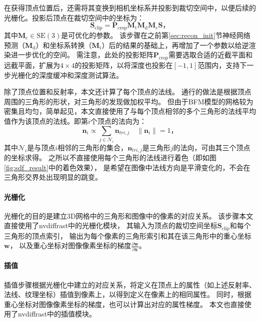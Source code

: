在获得顶点位置后，还需将其变换到相机坐标系并投影到裁切空间中，以便后续的光栅化。投影后顶点在裁切空间中的坐标为：
\begin{equation}
\mathbf{S}_\mathrm{clip} = \mathbf{P}_\mathrm{crop}\mathbf{M}_\mathrm{t}\mathbf{M}_\mathrm{d}\mathbf{M}_\mathrm{c}\mathbf{S}
\text{，}
\end{equation}
其中$\mathbf{M}_\mathrm{c}\in \mathrm{SE(3)}$是可优化的参数。
该步骤在之前第\ref{sec:recon_init}节神经网络预测（$\mathbf{M}_\mathrm{d}$）和坐标系转换（$\mathbf{M}_\mathrm{t}$）后的结果的基础上，再增加了一个参数以给逆渲染进一步优化的空间。
需注意，此处的投影矩阵$\mathbf{P}_\mathrm{crop}$需要选取合适的近截平面和远截平面，扩展为$4\times 4$的投影矩阵，以将深度也投影在$[-1,1]$范围内，支持下一步光栅化的深度缓冲和深度测试算法。

除了顶点位置和反射率，本文还计算了每个顶点的法线。
通行的做法是根据顶点周围的三角形的形状，对三角形的发现做加权平均。
但由于BFM模型的网格较为密集且均匀，简单起见，本文直接使用了与每个顶点相邻的多个三角形的法线平均值作为该顶点的法线。即第$i$个顶点的法向为：
\begin{equation}
\mathbf{n}_i \propto \sum_{j\in\mathcal{N}_i}\mathbf{n}_{tri,j} \quad
\|\mathbf{n}_i\| = 1
\text{，}
\end{equation}
其中$\mathcal{N}_i$是与顶点$i$相邻的三角形的集合，$\mathbf{n}_{tri,j}$是三角形$j$的法向，可由其三个顶点的坐标求得。
之所以不直接使用每个三角形的法线进行着色（即如图\ref{fig:sdf_result}中的着色效果），
是希望在图像中法线方向是平滑变化的，不会在三角形交界处出现明显的跳变。

\paragraph{光栅化}
光栅化的目的是建立3D网格中的三角形和图像中的像素的对应关系。
该步骤本文直接使用了nvdiffrast中的光栅化模块，
其输入为顶点的裁切空间坐标$\mathbf{S}_\mathrm{clip}$和每个三角形的顶点索引，
输出为每个像素的三角形索引和其在该三角形中的重心坐标$\mathbf{w}$，
以及重心坐标对图像像素坐标的梯度$\frac{\partial\mathbf{w}}{\partial\mathbf{x}}$。

\paragraph{插值}
插值步骤根据光栅化中建立的对应关系，将定义在顶点上的属性（如上述反射率、法线、纹理坐标）插值到像素上，以得到定义在像素上的相同属性。
同时，根据重心坐标对图像像素坐标的梯度，也可以计算出对应的属性梯度。
本文也直接使用了nvdiffrast中的插值模块。

